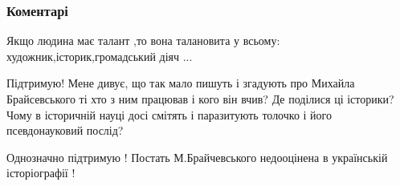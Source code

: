  
 
 
 
 
\subsubsection{Коментарі}
\label{sec:03_09_2021.fb.kotenko_tatiana.1.brajchevskij_mihail_muzej.cmt}

\begin{itemize}
 
Якщо людина має талант ,то вона талановита у всьому: художник,історик,громадський діяч ...

 

Підтримую! Мене дивує, що так мало пишуть і згадують про Михайла Брайсевського
ті хто з ним працював і кого він вчив? Де поділися ці історики? Чому в
історичній науці досі смітять і паразитують толочко і його псевдонауковий
послід?

 
Однозначно підтримую ! Постать М.Брайчевського недооцінена в українській історіографії !
\end{itemize}

